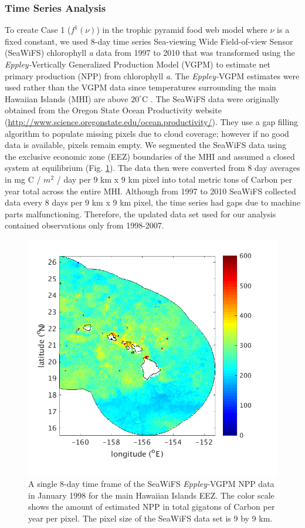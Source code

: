 \documentclass[oneside,12pt,final]{sty/ucthesis-CA2012}
\let\cite\citep                             %
\begin{document}
\begin{mainmatter}
\subsubsection{Time Series Analysis}
To create Case 1 ($f^1(\nu)$) in the trophic pyramid food web model where $\nu$ is a fixed constant, we used 8-day time series Sea-viewing Wide Field-of-view Sensor (SeaWiFS) chlorophyll \textit{a} data from 1997 to 2010 that was transformed using the \textit{Eppley-}Vertically Generalized Production Model (VGPM) to estimate net primary production (NPP) from chlorophyll \textit{a}. The \textit{Eppley-}VGPM estimates were used rather than the VGPM data since temperatures surrounding the main Hawaiian Islands (MHI) are above $20^{\circ}$C \cite{morel1991pigment, antoine1996oceanic, stock2017reconciling}. The SeaWiFS data were originally obtained from the Oregon State Ocean Productivity website (\url{http://www.science.oregonstate.edu/ocean.productivity/}). They use a gap filling algorithm to populate missing pixels due to cloud coverage; however if no good data is available, pixels remain empty. We segmented the SeaWiFS data using the exclusive economic zone (EEZ) boundaries of the MHI and assumed a closed system at equilibrium (Fig. \ref{A2:SeaWiFSmhi}). The data then were converted from 8 day averages in mg C / $m^2$ / day per 9 km x 9 km pixel into total metric tons of Carbon per year total across the entire MHI. Although from 1997 to 2010 SeaWiFS collected data every 8 days  per 9 km x 9 km pixel, the time series had gaps due to machine parts malfunctioning. Therefore, the updated data set used for our analysis contained observations only from 1998-2007. 

\begin{figure}[H]
     \centering
       \includegraphics[width=.7\textwidth]{fig/SeaWiFSmhi}
    \caption{A single 8-day time frame of the SeaWiFS \textit{Eppley-}VGPM NPP data in January 1998 for the main Hawaiian Islands EEZ. The color scale shows the amount of estimated NPP in total gigatons of Carbon per year per pixel. The pixel size of the SeaWiFS data set is 9 by 9 km.}
    \label{A2:SeaWiFSmhi}
\end{figure}


\end{mainmatter}
\end{document}
